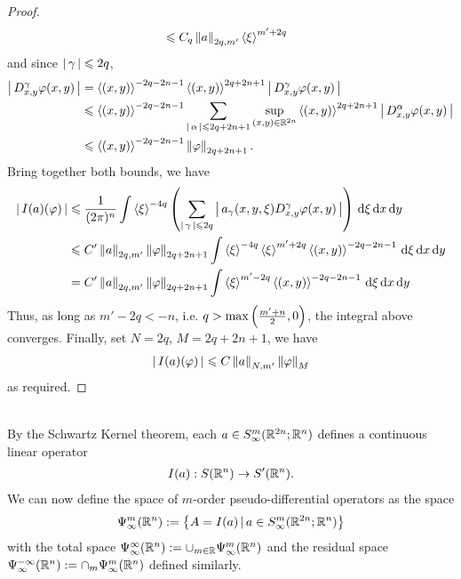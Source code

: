 \documentclass{article}
\begin{document}
\begin{proof}
\begin{align*}
    & \leq C_q \norm[a]_{2q, m'} \sym[\xi]^{m' + 2q}
    \end{align*}
    and  since $\abs{\gamma} \leq 2q$, 
    \begin{align*}
    \abs{D^{\gamma}_{x, y} \varphi(x, y)}
    & = \sym[(x, y)]^{-2q - 2n - 1} \sym[(x, y)]^{2q + 2n + 1} \abs{D^{\gamma}_{x, y} \varphi(x,y)}\\
    & \leq \sym[(x, y)]^{-2q - 2n - 1} \sum_{\abs{\alpha} \leq 2q + 2n + 1} \sup_{(x, y) \in \R^{2n}} \sym[(x, y)]^{2q + 2n + 1} \abs{D^{\alpha}_{x, y} \varphi(x,y)}\\
    & \leq \sym[(x, y)]^{-2q - 2n - 1} \norm[\varphi]_{2q + 2n + 1}. 
    \end{align*}
    Bring together both bounds, we have 
    \begin{align*}
    \abs{I(a)(\varphi)} 
    & \leq \frac{1}{(2\pi)^n} \int \sym[\xi]^{-4q} \brac{ \sum_{\abs{\gamma} \leq 2q} \abs{a_\gamma(x, y, \xi) D^\gamma_{x, y} \varphi(x, y)}} \d[\xi] \d[x] \d[y]\\
    & \leq C' \norm[a]_{2q, m'}\norm[\varphi]_{2q + 2n + 1}  \int \sym[\xi]^{-4q}   \sym[\xi]^{m' + 2q} \sym[(x, y)]^{-2q - 2n - 1}  \d[\xi] \d[x] \d[y]\\
    & = C' \norm[a]_{2q, m'}\norm[\varphi]_{2q + 2n + 1}  \int    \sym[\xi]^{m' - 2q} \sym[(x, y)]^{-2q - 2n - 1}  \d[\xi] \d[x] \d[y]\\
    \end{align*}
    Thus, as long as $m' - 2q < -n$, i.e. $q > \max\brac{\frac{m' + n}{2}, 0}$, the integral above converges. Finally, set $N = 2q$, $M = 2q + 2n + 1$, we have 
    \begin{align*}
    \abs{I(a)(\varphi)} \leq C \norm[a]_{N, m'}\norm[\varphi]_{M} 
    \end{align*}
    as required. 
\end{proof}

\hfill \\ [3em]
By the Schwartz Kernel theorem, each $a \in S^{m}_\infty(\R^{2n}; \R^n)$ defines a continuous linear operator 
\begin{align*}
I(a) : S(\R^n) \to S'(\R^n).
\end{align*}
We can now define the space of $m$-order pseudo-differential operators as the space 
\begin{align*}
\Psi^{m}_\infty(\R^n) := \set{A = I(a) \wh a \in S^{m}_\infty(\R^{2n}; \R^n)}
\end{align*}
with the total space $\Psi^{\infty}_\infty(\R^n) := \cup_{m \in \R} \Psi^m_\infty(\R^n)$ and the residual space $\Psi^{-\infty}_\infty(\R^n) := \cap_m \Psi^m_\infty(\R^n)$ defined similarly. 
\end{document}
